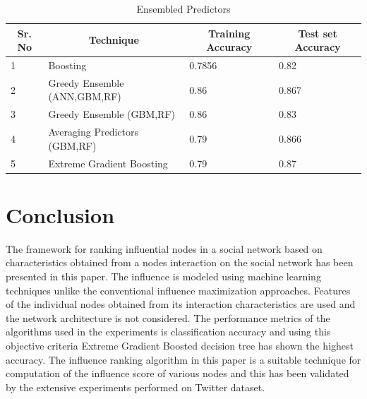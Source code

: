 \documentclass[conference]{IEEEtran}
\begin{document}
\begin{table}[!h]
\renewcommand{\arraystretch}{2.5}
\caption{Ensembled Predictors}
\label{table}
\centering
\begin{tabular}{|p{0.1in}|p{0.75in}|p{0.51in}|p{.51in}|}
  \hline
\multicolumn{1}{|c|}{\textbf{Sr. No}} & \multicolumn{1}{c|}{\textbf{Technique}} & \multicolumn{1}{c|}{\textbf{Training Accuracy}} & \multicolumn{1}{c|}{\textbf{Test set Accuracy}}\\
  \hline
  1 & Boosting &  0.7856 & 0.82 \\
  \hline
  2 & Greedy Ensemble (ANN,GBM,RF) &  0.86 & 0.867 \\
  \hline
  3 & Greedy Ensemble (GBM,RF) &  0.86 & 0.83 \\
    \hline
  4 & Averaging Predictors (GBM,RF) &  0.79 & 0.866 \\
    \hline
  5 & Extreme Gradient Boosting &  0.79 & 0.87 \\
  \hline
\end{tabular}
\end{table}








\section{Conclusion}
The framework for ranking influential nodes in a social network based on characteristics obtained from a nodes interaction on the social network has been presented in this paper. The influence is modeled using machine learning techniques unlike the conventional influence maximization approaches. Features of the individual nodes obtained from its interaction characteristics  are used and the network architecture is not considered. The performance metrics of the algorithms used in the experiments is classification accuracy and using this objective criteria Extreme Gradient Boosted decision tree has shown the highest accuracy. The influence ranking algorithm in this paper is a suitable technique for computation of the influence score of various nodes and this has been validated by the extensive experiments performed on Twitter dataset.   







\end{document}

